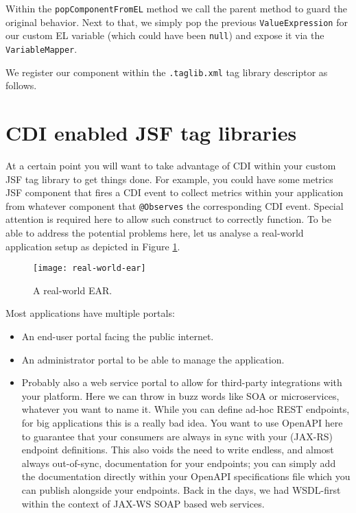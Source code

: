 Within the \texttt{popComponentFromEL} method we call the parent method to guard the original behavior.
Next to that, we simply pop the previous \texttt{ValueExpression} for our custom EL variable (which could have been \texttt{null}) and expose it via the \texttt{VariableMapper}.

We register our component within the \texttt{.taglib.xml} tag library descriptor as follows.


\section{CDI enabled JSF tag libraries}
At a certain point you will want to take advantage of CDI within your custom JSF tag library to get things done.
For example, you could have some metrics JSF component that fires a CDI event to collect metrics within your application from whatever component that \texttt{@Observes} the corresponding CDI event.
Special attention is required here to allow such construct to correctly function.
To be able to address the potential problems here, let us analyse a real-world application setup as depicted in Figure \ref{fig:real-world-ear}.
\begin{figure}[htbp]
	\begin{center}
		\texttt{[image: real-world-ear]}
		\caption{A real-world EAR.}
		\label{fig:real-world-ear}
	\end{center}
\end{figure}
Most applications have multiple portals:
\begin{itemize}
	\item An end-user portal facing the public internet.
	\item An administrator portal to be able to manage the application.
	\item Probably also a web service portal to allow for third-party integrations with your platform.
	Here we can throw in buzz words like SOA or microservices, whatever you want to name it.
	While you can define ad-hoc REST endpoints, for big applications this is a really bad idea.
	You want to use OpenAPI here to guarantee that your consumers are always in sync with your (JAX-RS) endpoint definitions.
	This also voids the need to write endless, and almost always out-of-sync, documentation for your endpoints; you can simply add the documentation directly within your OpenAPI specifications file which you can publish alongside your endpoints.
	Back in the days, we had WSDL-first within the context of JAX-WS SOAP based web services.
\end{itemize}
